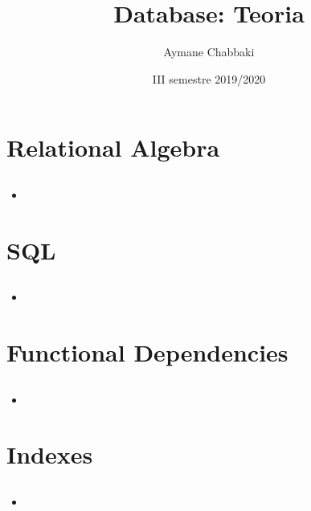 \documentclass[10pt]{article}
\title{Database: Teoria}
\author{Aymane Chabbaki}
\date{III semestre 2019/2020}
\begin{document}
\maketitle
\tableofcontents
\newpage

\section{Relational Algebra}
	\subsection{}
	\begin{itemize}
	\item
	\end{itemize}	
\section{SQL}
	\subsection{}
	\begin{itemize}
	\item
	\end{itemize}
\section{Functional Dependencies}
	\subsection{}
	\begin{itemize}
	\item
	\end{itemize}
\section{Indexes}
	\subsection{}
	\begin{itemize}
	\item
	\end{itemize}
\end{document}

